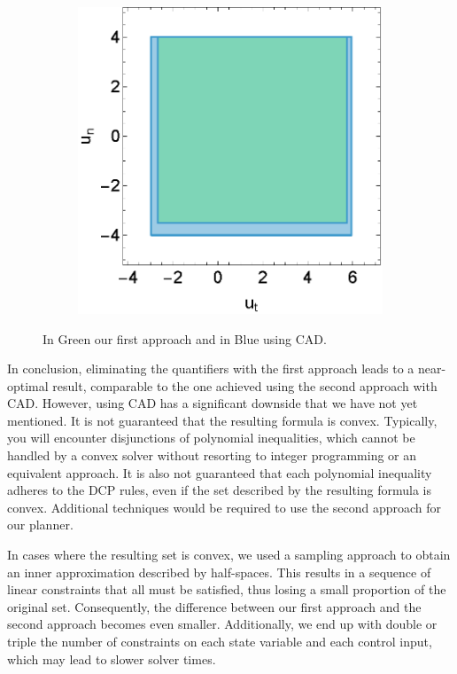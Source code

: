 \begin{figure}[h]
\begin{subfigure}[b]{0.32\textwidth}
	\end{subfigure}
	\begin{subfigure}[b]{0.32\textwidth}
		\centering
		\includegraphics[width=\textwidth]{figures/inner_polytope/region_u1u2_plot_gr1.eps}
	\end{subfigure}

	\caption{In Green our first approach and in Blue using CAD.}
\end{figure}

In conclusion, eliminating the quantifiers with the first approach leads to a near-optimal result, comparable to the one achieved using the second
approach with CAD.
However, using CAD has a significant downside that we have not yet mentioned.
It is not guaranteed that the resulting formula is convex.
Typically, you will encounter disjunctions of polynomial inequalities, which cannot be handled by a convex solver without resorting to integer
programming or an equivalent approach.
It is also not guaranteed that each polynomial inequality adheres to the DCP rules, even if the set described by the resulting formula is convex.
Additional techniques would be required to use the second approach for our planner.

In cases where the resulting set is convex, we used a sampling approach to obtain an inner approximation described by half-spaces.
This results in a sequence of linear constraints that all must be satisfied, thus losing a small proportion of the original set.
Consequently, the difference between our first approach and the second approach becomes even smaller.
Additionally, we end up with double or triple the number of constraints on each state variable and each control input, which may lead to slower
solver times.

